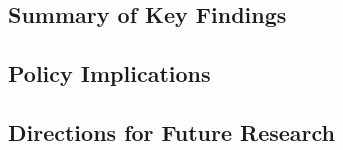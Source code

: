 \documentclass{article}
\begin{document}
\subsection{Summary of Key Findings}


\subsection{Policy Implications}


\subsection{Directions for Future Research}

\end{document}
